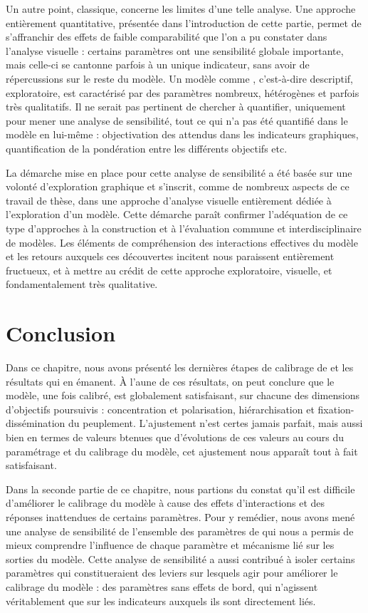 Un autre point, classique, concerne les limites d'une telle analyse.
Une approche entièrement quantitative, présentée dans l'introduction de cette partie, permet de s'affranchir des effets de faible comparabilité que l'on a pu constater dans l'analyse visuelle : certains paramètres ont une sensibilité globale importante, mais celle-ci se cantonne parfois à un unique indicateur, sans avoir de répercussions sur le reste du modèle.
Un modèle comme \simfeodal{}, c'est-à-dire descriptif, exploratoire, est caractérisé par des paramètres nombreux, hétérogènes et parfois très qualitatifs.
Il ne serait pas pertinent de chercher à quantifier, uniquement pour mener une analyse de sensibilité, tout ce qui n'a pas été quantifié dans le modèle en lui-même : objectivation des attendus dans les indicateurs graphiques, quantification de la pondération entre les différents objectifs etc.

La démarche mise en place pour cette analyse de sensibilité a été basée sur une volonté d'exploration graphique et s'inscrit, comme de nombreux aspects de ce travail de thèse, dans une approche d'analyse visuelle entièrement dédiée à l'exploration d'un modèle.
Cette démarche paraît confirmer l'adéquation de ce type d'approches à la construction et à l'évaluation commune et interdisciplinaire de modèles.
Les éléments de compréhension des interactions effectives du modèle et les retours auxquels ces découvertes incitent nous paraissent entièrement fructueux, et à mettre au crédit de cette approche exploratoire, visuelle, et fondamentalement très qualitative.

\section*{Conclusion}

Dans ce chapitre, nous avons présenté les dernières étapes de calibrage de \simfeodal{} et les résultats qui en émanent.
À l'aune de ces résultats, on peut conclure que le modèle, une fois calibré, est globalement satisfaisant, sur chacune des dimensions d'objectifs poursuivis : concentration et polarisation, hiérarchisation et fixation-dissémination du peuplement.
L'ajustement n'est certes jamais parfait, mais aussi bien en termes de valeurs btenues que d'évolutions de ces valeurs au cours du paramétrage et du calibrage du modèle, cet ajustement nous apparaît tout à fait satisfaisant.

Dans la seconde partie de ce chapitre, nous partions du constat qu'il est difficile d'améliorer le calibrage du modèle à cause des effets d'interactions et des réponses inattendues de certains paramètres.
Pour y remédier, nous avons mené une analyse de sensibilité de l'ensemble des paramètres de \simfeodal{} qui nous a permis de mieux comprendre l'influence de chaque paramètre et mécanisme lié sur les sorties du modèle.
Cette analyse de sensibilité a aussi contribué à isoler certains paramètres qui constitueraient des leviers sur lesquels agir pour améliorer le calibrage du modèle : des paramètres sans effets de bord, qui n'agissent véritablement que sur les indicateurs auxquels ils sont directement liés.


